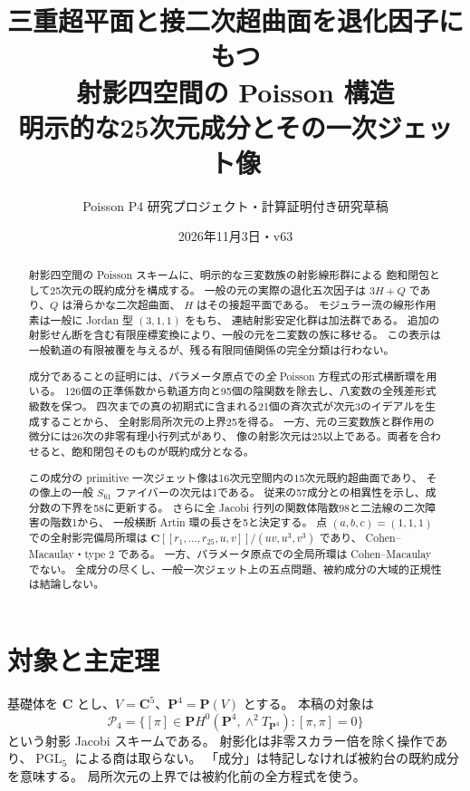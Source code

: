 \documentclass[11pt,a4paper]{ltjsarticle}
\title{三重超平面と接二次超曲面を退化因子にもつ\\
射影四空間の Poisson 構造\\[2mm]
\large 明示的な25次元成分とその一次ジェット像}
\author{Poisson P4 研究プロジェクト・計算証明付き研究草稿}
\date{2026年11月3日・v63}
\newcommand{\CC}{\mathbf C}
\newcommand{\PP}{\mathbf P}
\newcommand{\cP}{\mathcal P_4}
\DeclareMathOperator{\PGL}{PGL}
\theoremstyle{remark}
\begin{document}
\maketitle
\begin{abstract}
射影四空間の Poisson スキームに、明示的な三変数族の射影線形群による
飽和閉包として25次元の既約成分を構成する。
一般の元の実際の退化五次因子は $3H+Q$ であり、$Q$ は滑らかな二次超曲面、
$H$ はその接超平面である。
モジュラー流の線形作用素は一般に Jordan 型 $(3,1,1)$ をもち、
連結射影安定化群は加法群である。
追加の射影せん断を含む有限座標変換により、一般の元を二変数の族に移せる。
この表示は一般軌道の有限被覆を与えるが、残る有限同値関係の完全分類は行わない。

成分であることの証明には、パラメータ原点での\emph{全} Poisson 方程式の形式横断環を用いる。
126個の正準係数から軌道方向と95個の陰関数を除去し、八変数の全残差形式級数を保つ。
四次までの真の初期式に含まれる21個の斉次式が次元3のイデアルを生成することから、
全射影局所次元の上界25を得る。
一方、元の三変数族と群作用の微分には26次の非零有理小行列式があり、
像の射影次元は25以上である。両者を合わせると、飽和閉包そのものが既約成分となる。

この成分の primitive 一次ジェット像は16次元空間内の15次元既約超曲面であり、
その像上の一般 $S_{61}$ ファイバーの次元は1である。
従来の57成分との相異性を示し、成分数の下界を58に更新する。
さらに全 Jacobi 行列の関数体階数98と二法線の二次障害の階数1から、
一般横断 Artin 環の長さを5と決定する。
点 $(a,b,c)=(1,1,1)$ での全射影完備局所環は
$\CC[[r_1,\ldots,r_{25},u,v]]/(uv,u^3,v^3)$ であり、
Cohen--Macaulay・type 2 である。
一方、パラメータ原点での全局所環は Cohen--Macaulay でない。
全成分の尽くし、一般一次ジェット上の五点問題、被約成分の大域的正規性は結論しない。
\end{abstract}

\section{対象と主定理}

基礎体を $\CC$ とし、$V=\CC^5$、$\PP^4=\PP(V)$ とする。
本稿の対象は
\[
 \cP=\bigl\{[\pi]\in
 \PP H^0(\PP^4,\wedge^2T_{\PP^4}):[\pi,\pi]=0\bigr\}
\]
という射影 Jacobi スキームである。
射影化は非零スカラー倍を除く操作であり、$\PGL_5$ による商は取らない。
「成分」は特記しなければ被約台の既約成分を意味する。
局所次元の上界では被約化前の全方程式を使う。
\end{document}
